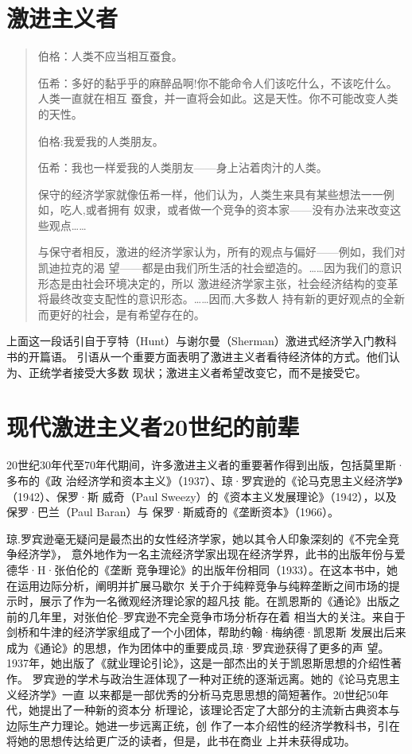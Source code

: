 \section{激进主义者}

\begin{quotation}
伯格：人类不应当相互蚕食。

伍希：多好的黏乎乎的麻醉品啊!你不能命令人们该吃什么，不该吃什么。人类一直就在相互
蚕食，并一直将会如此。这是天性。你不可能改变人类的天性。

伯格:我爱我的人类朋友。

伍希：我也一样爱我的人类朋友——身上沾着肉汁的人类。

\bigskip

保守的经济学家就像伍希一样，他们认为，人类生来具有某些想法一一例如，吃人,或者拥有
奴隶，或者做一个竞争的资本家——没有办法来改变这些观点……

与保守者相反，激进的经济学家认为，所有的观点与偏好——例如，我们对凯迪拉克的渴
望——都是由我们所生活的社会塑造的。……因为我们的意识形态是由社会环境决定的，所以
激进经济学家主张，社会经济结构的变革将最终改变支配性的意识形态。……因而,大多数人
持有新的更好观点的全新而更好的社会，是有希望存在的。
\end{quotation}

上面这一段话引自于亨特（Hunt）与谢尔曼（Sherman）激进式经济学入门教科书的开篇语。
引语从一个重要方面表明了激进主义者看待经济体的方式。他们认为、正统学者接受大多数
现状；激进主义者希望改变它，而不是接受它。


\section{现代激进主义者20世纪的前辈}

20世纪30年代至70年代期间，许多激进主义者的重要著作得到出版，包括莫里斯·多布的《政
治经济学和资本主义》（1937）、琼·罗宾逊的《论马克思主义经济学》（1942）、保罗·斯
威奇（Paul Sweezy）的《资本主义发展理论》（1942），以及保罗·巴兰（Paul Baran）与
保罗·斯威奇的《垄断资本》（1966）。

琼.罗宾逊毫无疑问是最杰出的女性经济学家，她以其令人印象深刻的《不完全竞争经济学》，
意外地作为一名主流经济学家出现在经济学界，此书的出版年份与爱德华·H·张伯伦的《垄断
竞争理论》的出版年份相同（1933）。在这本书中，她在运用边际分析，阐明并扩展马歇尔
关于介于纯粹竞争与纯粹垄断之间市场的提示时，展示了作为一名微观经济理论家的超凡技
能。在凯恩斯的《通论》出版之前的几年里，对张伯伦--罗宾逊不完全竞争市场分析存在着
相当大的关注。来自于剑桥和牛津的经济学家组成了一个小团体，帮助约翰·梅纳德·凯恩斯
发展出后来成为《通论》的思想，作为团体中的重要成员,琼·罗宾逊获得了更多的声
望。1937年，她出版了《就业理论引论》，这是一部杰出的关于凯恩斯思想的介绍性著作。
罗宾逊的学术与政治生涯体现了一种对正统的逐渐远离。她的《论马克思主义经济学》一直
以来都是一部优秀的分析马克思思想的简短著作。20世纪50年代，她提出了一种新的资本分
析理论，该理论否定了大部分的主流新古典资本与边际生产力理论。她进一步远离正统，创
作了一本介绍性的经济学教科书，引在将她的思想传达给更广泛的读者，但是，此书在商业
上并未获得成功。


